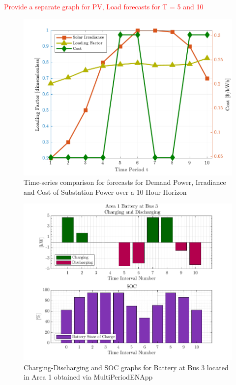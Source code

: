 \documentclass[../../outputs/main.tex]{subfiles}
\begin{document}
\textcolor{red}{Provide a separate graph for PV, Load forecasts for T = 5 and 10}


\begin{figure}[h!]
    \centering
    \includegraphics[height=0.25\textheight]{../figures/T10-inputCurves/InputCurves_Horizon_10_pv_20_batt_30.png}
    \caption{Time-series comparison for forecasts for Demand Power, Irradiance and Cost of Substation Power over a 10 Hour Horizon}
    \label{fig:inputCurve-10}
\end{figure}



\begin{figure}[h!]
    \centering
    \includegraphics[width=\linewidth]{../figures/T10-pv20-batt30-genCost/copf/BatteryPlots/macroItr_1_genCost_Battery_1_alpha_0.001.png}
    \caption{Charging-Discharging and SOC graphs for Battery at Bus 3 located in Area 1 obtained via MultiPeriodENApp}
    \label{fig:batt-plot-copf-10-20-30-genCost}
\end{figure}
    

\lipsum[1]
\end{document}
